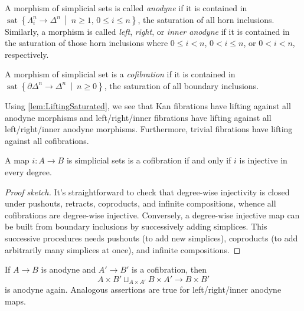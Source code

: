 \begin{defi}\label{def:Anodyne}
	\begin{alphanumerate}
		\item A morphism of simplicial sets is called \emph{anodyne} if it is contained in $\operatorname{sat}\left\{\Lambda_i^n\rightarrow\Delta^n\ \middle|\ n\geqslant 1,\,0\leqslant i\leqslant n\right\}$, the saturation of all horn inclusions. Similarly, a morphism is called \emph{left}, \emph{right}, or \emph{inner anodyne} if it is contained in the saturation of those horn inclusions where $0\leqslant i<n$, $0<i\leqslant n$, or $0<i<n$, respectively.
		\item A morphism of simplicial set is a \emph{cofibration} if it is contained in $\operatorname{sat}\left\{\partial\Delta^n\rightarrow\Delta^n\ \middle|\ n\geqslant 0\right\}$, the saturation of all boundary inclusions.
	\end{alphanumerate}
\end{defi}
\begin{exm}
	Using \cref{lem:LiftingSaturated}, we see that Kan fibrations have lifting against all anodyne morphisms and left/right/inner fibrations have lifting against all left/right/inner anodyne morphisms. Furthermore, trivial fibrations have lifting against all cofibrations.
\end{exm}	
\begin{lem}\label{lem:Cofibration}
	A map $i\colon A\rightarrow B$ is simplicial sets is a cofibration if and only if $i$ is injective in every degree.
\end{lem}
\begin{proof}[Proof sketch]
	It's straightforward to check that degree-wise injectivity is closed under pushouts, retracts, coproducts, and infinite compositions, whence all cofibrations are degree-wise injective. Conversely, a degree-wise injective map can be built from boundary inclusions by successively adding simplices. This successive procedures needs pushouts (to add new simplices), coproducts (to add arbitrarily many simplices at once), and infinite compositions.
\end{proof}
\begin{lem}\label{lem:AnodynePushout}
	If $A\rightarrow B$ is anodyne and $A'\rightarrow B'$ is a cofibration, then
	\begin{equation*}
		A\times B'\sqcup_{A\times A'}B\times A'\longrightarrow B\times B'
	\end{equation*}
	is anodyne again. Analogous assertions are true for left/right/inner anodyne maps.
\end{lem}
